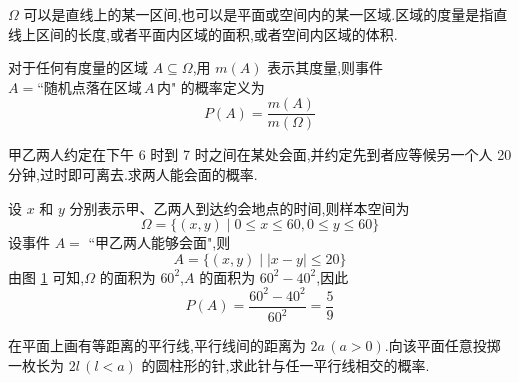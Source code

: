 \begin{note}
    \indent $\varOmega$ 可以是直线上的某一区间,也可以是平面或空间内的某一区域.区域的度量是指直线上区间的长度,或者平面内区域的面积,或者空间内区域的体积.
\end{note}

对于任何有度量的区域 $A \subseteq \varOmega$,用 $m(A)$ 表示其度量,则事件 $A = \text{``随机点落在区域}\, A \,\text{内"}$ 的概率定义为
$$
P(A)=\dfrac{m(A)}{m(\varOmega)}
$$

\begin{example}[][会面问题]
    \indent 甲乙两人约定在下午 6 时到 7 时之间在某处会面,并约定先到者应等候另一个人 20 分钟,过时即可离去.求两人能会面的概率.
\end{example}

\begin{solution}
    设 $x$ 和 $y$ 分别表示甲、乙两人到达约会地点的时间,则样本空间为
    $$
    \varOmega = \{ (x,y) \mid 0 \leqslant x \leqslant 60, 0 \leqslant y \leqslant 60 \}
    $$
    设事件 $A=$ ``甲乙两人能够会面",则
    $$
    A = \{ (x,y) \mid |x-y| \leqslant 20 \}
    $$
    由图 \ref{fig:会面问题} 可知,$\varOmega$ 的面积为 $60^2$,$A$ 的面积为 $60^2 - 40^2$,因此
    $$
    P(A) = \dfrac{60^2 - 40^2}{60^2} = \dfrac{5}{9}
    $$

    \begin{figure}[H]
        \centering


        \caption{}
        \label{fig:会面问题}
    \end{figure}
\end{solution}

\begin{example}[][蒲丰投针问题]
    \indent 在平面上画有等距离的平行线,平行线间的距离为 $2a \, (a>0)$.向该平面任意投掷一枚长为 $2l \, (l<a)$ 的圆柱形的针,求此针与任一平行线相交的概率.
\end{example}

